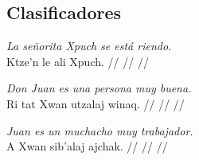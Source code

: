 \documentclass{article}%
\begin{document}
\subsection{Clasificadores}%
\label{subsec:Clasificadores}%

%
\par\medskip%
\ex
\textit{La señorita Xpuch se está riendo.} \\
\begingl
\gla Ktze’n le ali Xpuch. //
\glb  //
\glc  //
\endgl
\xe
%
\medskip%
\par\medskip%
\ex
\textit{Don Juan es una persona muy buena.} \\
\begingl
\gla Ri tat Xwan utzalaj winaq. //
\glb  //
\glc  //
\endgl
\xe
%
\medskip%
\par\medskip%
\ex
\textit{Juan es un muchacho muy trabajador.} \\
\begingl
\gla A Xwan sib’alaj ajchak. //
\glb  //
\glc  //
\endgl
\xe
%
\medskip

%
\end{document}
